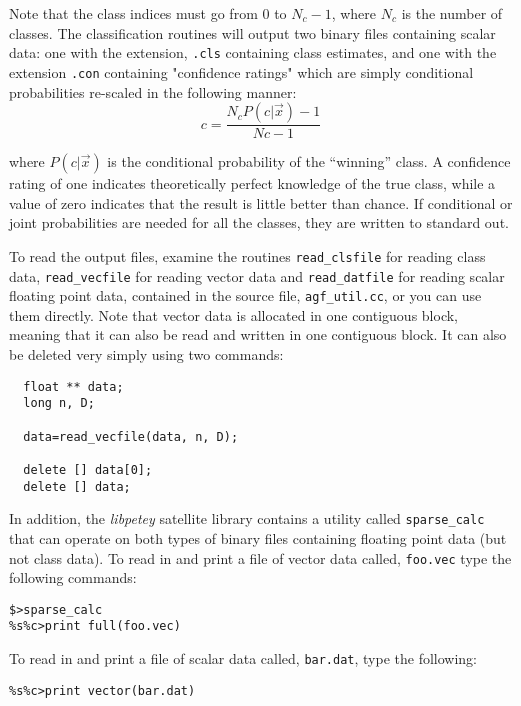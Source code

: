 \documentclass[12pt]{article}
\begin{document}
Note that the class indices must go from 0 to $N_c-1$, where $N_c$ is the number of classes.  The classification routines will output two binary files containing scalar data:  one with the extension, \verb".cls" containing class estimates, and one with the extension \verb".con" containing "confidence ratings" which are simply conditional probabilities re-scaled in the following manner:
\begin{equation}
c = \frac{N_c P(c | \vec x) - 1}{Nc - 1}
\end{equation}

where $P(c | \vec x)$ is the conditional probability of the ``winning'' class.  A confidence rating of one indicates theoretically perfect knowledge of the true class, while a value of zero indicates that the result is little better than chance.  If conditional or joint probabilities are needed for all the classes, they are written to standard out.

To read the output files, examine the routines \verb"read_clsfile" for reading class data, \verb"read_vecfile" for reading vector data and \verb"read_datfile" for reading scalar floating point data, contained in the source file, \verb"agf_util.cc", or you can use them directly.  Note that vector data is allocated in one contiguous block, meaning that it can also be read and written in one contiguous block.  It can also be deleted very simply using two commands:

\begin{verbatim}
  float ** data;
  long n, D;

  data=read_vecfile(data, n, D);

  delete [] data[0];
  delete [] data;
\end{verbatim}

In addition, the {\it libpetey} satellite library contains a utility called \verb/sparse_calc/ that can operate on both types of binary files containing floating point data (but not class data).  To read in and print a file of vector data called, \verb"foo.vec" type the following commands:

\begin{verbatim}
$>sparse_calc
%s%c>print full(foo.vec)
\end{verbatim}

To read in and print a file of scalar data called, \verb"bar.dat", type the following:

\begin{verbatim}
%s%c>print vector(bar.dat)
\end{verbatim}
\end{document}

